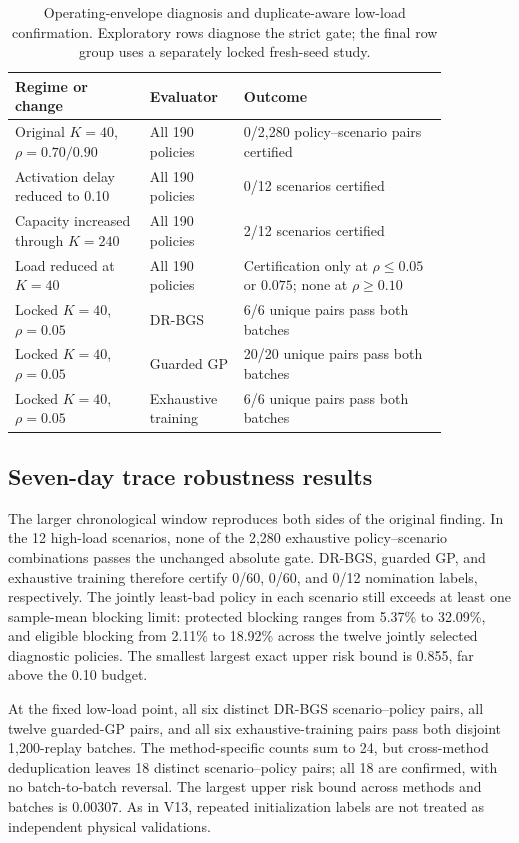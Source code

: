 \documentclass[preprint,12pt]{elsarticle}
\begin{document}
\begin{table}[t]
\centering
\small
\caption{Operating-envelope diagnosis and duplicate-aware low-load confirmation. Exploratory rows diagnose the strict gate; the final row group uses a separately locked fresh-seed study.}
\label{tab:operating-envelope}
\begin{tabular}{p{0.27\linewidth}p{0.18\linewidth}p{0.41\linewidth}}
\toprule
Regime or change & Evaluator & Outcome \\
\midrule
Original $K=40$, $\rho=0.70/0.90$ & All 190 policies & 0/2,280 policy--scenario pairs certified \\
Activation delay reduced to 0.10 & All 190 policies & 0/12 scenarios certified \\
Capacity increased through $K=240$ & All 190 policies & 2/12 scenarios certified \\
Load reduced at $K=40$ & All 190 policies & Certification only at $\rho\le0.05$ or $0.075$; none at $\rho\ge0.10$ \\
\midrule
Locked $K=40$, $\rho=0.05$ & DR-BGS & 6/6 unique pairs pass both batches \\
Locked $K=40$, $\rho=0.05$ & Guarded GP & 20/20 unique pairs pass both batches \\
Locked $K=40$, $\rho=0.05$ & Exhaustive training & 6/6 unique pairs pass both batches \\
\bottomrule
\end{tabular}
\end{table}

\subsection{Seven-day trace robustness results}
\label{sec:v15results}

The larger chronological window reproduces both sides of the original finding. In the 12 high-load scenarios, none of the 2,280 exhaustive policy--scenario combinations passes the unchanged absolute gate. DR-BGS, guarded GP, and exhaustive training therefore certify 0/60, 0/60, and 0/12 nomination labels, respectively. The jointly least-bad policy in each scenario still exceeds at least one sample-mean blocking limit: protected blocking ranges from 5.37\% to 32.09\%, and eligible blocking from 2.11\% to 18.92\% across the twelve jointly selected diagnostic policies. The smallest largest exact upper risk bound is 0.855, far above the 0.10 budget.

At the fixed low-load point, all six distinct DR-BGS scenario--policy pairs, all twelve guarded-GP pairs, and all six exhaustive-training pairs pass both disjoint 1,200-replay batches. The method-specific counts sum to 24, but cross-method deduplication leaves 18 distinct scenario--policy pairs; all 18 are confirmed, with no batch-to-batch reversal. The largest upper risk bound across methods and batches is 0.00307. As in V13, repeated initialization labels are not treated as independent physical validations.
\end{document}
